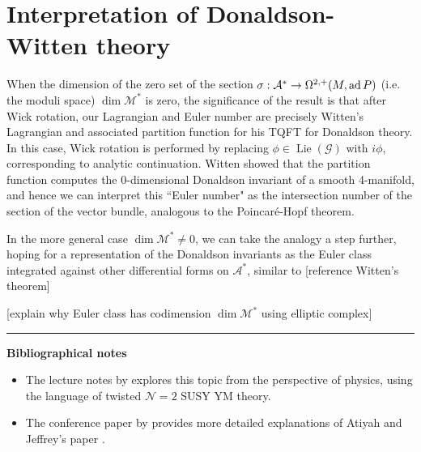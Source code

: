 \section{Interpretation of Donaldson-Witten theory}
When the dimension of the zero set 
of the section $\sigma : \mathcal{A}^* \to \Omega^{2,+}(M,\operatorname{ad} P)$ (i.e.
the moduli space) $\dim \mathcal{M}^*$ is zero, the significance of the result 
is that after Wick rotation, our Lagrangian and 
Euler number are precisely Witten's Lagrangian and associated partition function
for his TQFT for Donaldson theory.\cite{wittenTQFT} 
In this case, Wick rotation is performed by replacing 
$\phi \in \operatorname{Lie}(\mathcal{G})$ with $i\phi$, corresponding
to analytic continuation. Witten showed that the partition function computes the
0-dimensional Donaldson invariant of a smooth 4-manifold, and hence we can
interpret this ``Euler number" as the intersection number of the section of the 
vector bundle, analogous to the Poincar\'e-Hopf theorem. 

In the more general case $\dim \mathcal{M}^* \neq 0$, we can take the analogy a 
step further, hoping for a representation of the
Donaldson invariants as the Euler class integrated against
other differential forms on $\mathcal{A}^*$, similar to [reference Witten's theorem] 

[explain why Euler class has codimension $\dim\mathcal{M}^*$ using elliptic
complex]

\vspace{5mm}
\hrule 
\vspace{5mm}

\textbf{Bibliographical notes}
{\small
\begin{itemize}
	\item The lecture notes by \citet{cordes95} explores this topic from the
	perspective of physics, using the language of twisted 
	$\mathcal{N}=2$ SUSY YM theory.
	\item The conference paper by \citet{naber} provides more detailed
	explanations of Atiyah and Jeffrey's paper \cite{atiyahlagrangians}.
\end{itemize}
}


